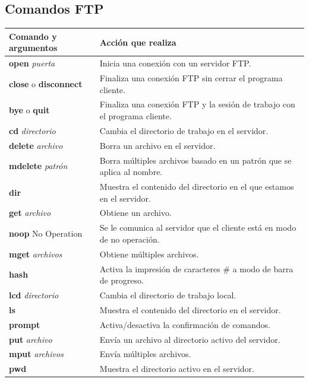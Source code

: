 \documentclass[a4paper, 12pt]{article}
\begin{document}
\subsection{Comandos FTP}
\begin{table}[ht]
\centering
\begin{tabular}{|p{4cm}|p{10cm}|}
\hline
\textbf{Comando y argumentos} & \textbf{Acción que realiza} \\ \hline
\textbf{open} \textit{puerta} & Inicia una conexión con un servidor FTP. \\ \hline
\textbf{close} o \textbf{disconnect} & Finaliza una conexión FTP sin cerrar el programa cliente. \\ \hline
\textbf{bye} o \textbf{quit} & Finaliza una conexión FTP y la sesión de trabajo con el programa cliente. \\ \hline
\textbf{cd} \textit{directorio} & Cambia el directorio de trabajo en el servidor. \\ \hline
\textbf{delete} \textit{archivo} & Borra un archivo en el servidor. \\ \hline
\textbf{mdelete} \textit{patrón} & Borra múltiples archivos basado en un patrón que se aplica al nombre. \\ \hline
\textbf{dir} & Muestra el contenido del directorio en el que estamos en el servidor. \\ \hline
\textbf{get} \textit{archivo} & Obtiene un archivo. \\ \hline
\textbf{noop} No Operation & Se le comunica al servidor que el cliente está en modo de no operación. \\ \hline
\textbf{mget} \textit{archivos} & Obtiene múltiples archivos. \\ \hline
\textbf{hash} & Activa la impresión de caracteres \# a modo de barra de progreso. \\ \hline
\textbf{lcd} \textit{directorio} & Cambia el directorio de trabajo local. \\ \hline
\textbf{ls} & Muestra el contenido del directorio en el servidor. \\ \hline
\textbf{prompt} & Activa/desactiva la confirmación de comandos. \\ \hline
\textbf{put} \textit{archivo} & Envía un archivo al directorio activo del servidor. \\ \hline
\textbf{mput} \textit{archivos} & Envía múltiples archivos. \\ \hline
\textbf{pwd} & Muestra el directorio activo en el servidor. \\ \hline

\end{tabular}
\end{table}
\end{document}
